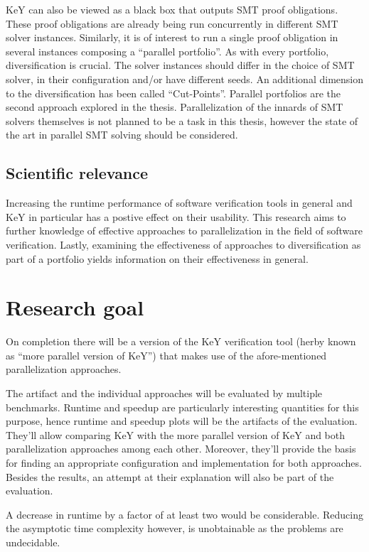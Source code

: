 \documentclass{scrartcl}
\begin{document}
KeY can also be viewed as a black box that outputs SMT proof obligations.
These proof obligations are already being run concurrently in different SMT solver instances.
Similarly, it is of interest to run a single proof obligation in several instances
composing a \enquote{parallel portfolio}.
As with every portfolio, diversification is crucial.
The solver instances should differ in the choice of SMT solver,
in their configuration and/or have different seeds.
An additional dimension to the diversification has been called \enquote{Cut-Points}.
Parallel portfolios are the second approach explored in the thesis.
Parallelization of the innards of SMT solvers themselves is not planned to be a task in this thesis,
however the state of the art in parallel SMT solving should be considered.

\subsection{Scientific relevance}
Increasing the runtime performance of software verification tools in general and KeY in particular
has a postive effect on their usability.
This research aims to further knowledge of effective approaches to parallelization
in the field of software verification.
Lastly, examining the effectiveness of approaches to diversification as part of a portfolio
yields information on their effectiveness in general.

\section{Research goal}
On completion there will be a version of the KeY verification tool
(herby known as \enquote{more parallel version of KeY})
that makes use of the afore-mentioned parallelization approaches.

The artifact and the individual approaches will be evaluated by multiple benchmarks.
Runtime and speedup are particularly interesting quantities for this purpose,
hence runtime and speedup plots will be the artifacts of the evaluation.
They'll allow comparing KeY with the more parallel version of KeY and
both parallelization approaches among each other.
Moreover, they'll provide the basis for finding an appropriate configuration
and implementation for both approaches.
Besides the results, an attempt at their explanation will also be part of the evaluation.

A decrease in runtime by a factor of at least two would be considerable.
Reducing the asymptotic time complexity however, is unobtainable
as the problems are undecidable.
\end{document}
